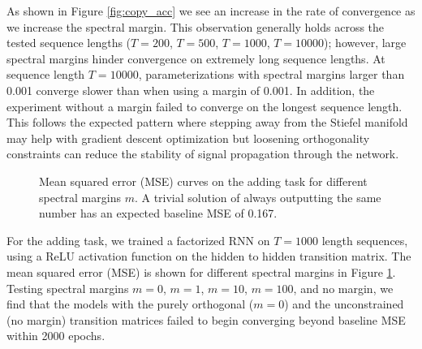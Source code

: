 \documentclass{article} %
\begin{document}
As shown in Figure \ref{fig:copy_acc} we see an increase in the rate of convergence as we increase the spectral margin. This observation generally holds across the tested sequence lengths (${\mathit{T}=200}$, ${\mathit{T}=500}$, ${\mathit{T}=1000}$, ${\mathit{T}=10000}$); however, large spectral margins hinder convergence on extremely long sequence lengths. At sequence length ${\mathit{T}=10000}$, parameterizations with spectral margins larger than 0.001 converge slower than when using a margin of 0.001. In addition, the experiment without a margin failed to converge on the longest sequence length. This follows the expected pattern where stepping away from the Stiefel manifold may help with gradient descent optimization but loosening orthogonality constraints can reduce the stability of signal propagation through the network.

\begin{figure}[htb!]
\centering
{}
\caption{Mean squared error (MSE) curves on the adding task for different spectral margins ${\mathit{m}}$. A trivial solution of always outputting the same number has an expected baseline MSE of 0.167.}
\label{fig:adding}
\end{figure}

For the adding task, we trained a factorized RNN on ${\mathit{T}=1000}$ length sequences, using a ReLU activation function on the hidden to hidden transition matrix. The mean squared error (MSE) is shown for different spectral margins in Figure \ref{fig:adding}. Testing spectral margins ${\mathit{m}=0}$, ${\mathit{m}=1}$, ${\mathit{m}=10}$, ${\mathit{m}=100}$, and no margin, we find that the models with the purely orthogonal (${\mathit{m}=0}$) and the unconstrained (no margin) transition matrices failed to begin converging beyond baseline MSE within 2000 epochs.
\end{document}
